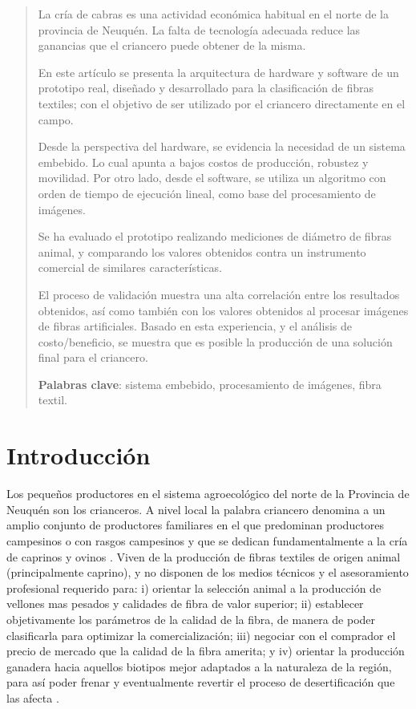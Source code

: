\documentclass[runningheads,a4paper]{llncs}
\begin{document}
\begin{abstract}

La cría de cabras es una actividad económica habitual en el norte de la provincia de Neuquén. 
La falta de tecnología adecuada reduce las ganancias que el criancero puede obtener de la misma. 

En este artículo se presenta la arquitectura de hardware y 
software de un prototipo real, diseñado y desarrollado para la clasificación 
de fibras textiles; con el objetivo de ser utilizado por el criancero directamente en el campo. 

Desde la perspectiva del hardware, se evidencia la necesidad de un sistema
embebido. Lo cual apunta a bajos costos de producción, robustez y movilidad. 
Por otro lado, desde el software, se utiliza un algoritmo con orden de
tiempo de ejecución lineal, como base del procesamiento de imágenes. 

Se ha evaluado el prototipo realizando mediciones de diámetro de fibras animal,
y comparando los valores obtenidos contra un instrumento comercial de similares
características.

El proceso de validación muestra una alta correlación entre los resultados
obtenidos, así como también con 
los valores obtenidos al procesar imágenes de fibras artificiales. 
Basado en esta experiencia, y 
el análisis de costo/beneficio, se muestra que es posible la producción de una solución final para el criancero. 

{\bf Palabras clave}: sistema embebido, procesamiento de imágenes, fibra textil.

\end{abstract}


\section{Introducción}

Los pequeños productores en el sistema agroecológico del norte de la Provincia de Neuquén son los crianceros. A nivel local la palabra criancero denomina a un amplio conjunto de productores familiares en el que predominan productores campesinos o con rasgos campesinos y que se dedican fundamentalmente a la cría de caprinos y ovinos \cite{bendini2}. Viven de la producción de fibras textiles de origen animal (principalmente caprino), y no disponen de los medios técnicos y el asesoramiento profesional requerido para: i) orientar la selección animal a la producción de vellones mas pesados y calidades de fibra de valor superior; ii) establecer objetivamente los parámetros de la calidad de la fibra, de manera de poder clasificarla para optimizar la comercialización; iii) negociar con el comprador el precio de mercado que la calidad de la fibra amerita; y iv) orientar la producción ganadera hacia aquellos biotipos mejor adaptados a la naturaleza de la región, para así poder frenar y eventualmente revertir el proceso de desertificación que las afecta \cite{bendini1}.
\end{document}

